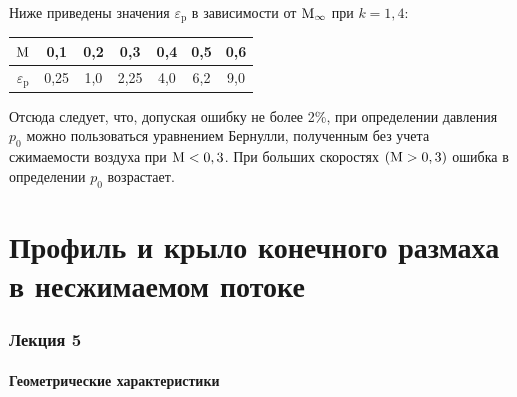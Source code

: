 	Ниже приведены значения $\varepsilon_\mathrm{p}$ в зависимости от $\mathrm{M}_\infty$ при $k = 1,4$:
	\begin{table}[htbp]
		\centering
		\begin{tabular}{c|cccccc}
			$\mathrm{M}$ & 0,1 & 0,2 & 0,3 & 0,4 & 0,5 & 0,6 \\
			\hline
			$\varepsilon_\mathrm{p}$ & 0,25 & 1,0 & 2,25 & 4,0 & 6,2 & 9,0 \\
		\end{tabular}
	\end{table}\n
	Отсюда следует, что, допуская ошибку не более 2\%, при определении давления $p_0$ можно пользоваться уравнением Бернулли, полученным без учета сжимаемости воздуха при $\mathrm{M} < 0,3$. При больших скоростях $\left(\mathrm{M} > 0,3\right)$ ошибка в определении $p_0$ возрастает.
	
	\newpage
	\part{Профиль и крыло конечного размаха в несжимаемом потоке}
	
	\section{Лекция 5}
	
	\subsection{Геометрические характеристики}
	
